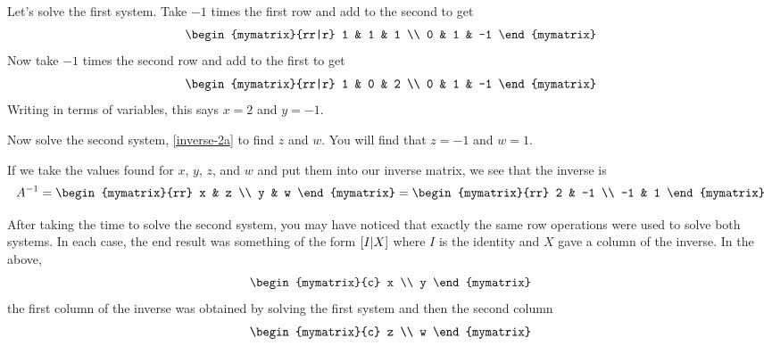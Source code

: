
Let's solve the first system. Take $-1$ times
the first row and add to the second to get
\begin{equation*}
  \begin{mymatrix}{rr|r}
    1 & 1 & 1 \\
    0 & 1 & -1
  \end{mymatrix}
\end{equation*}
Now take $-1$ times the second row and add to the first to
get
\begin{equation*}
  \begin{mymatrix}{rr|r}
    1 & 0 & 2 \\
    0 & 1 & -1
  \end{mymatrix} 
\end{equation*}
Writing in terms of variables, this says $x=2$ and $y=-1$.

Now solve the second system, \ref{inverse-2a} to find $z$ and $w$. You will find that 
$z = -1$ and $w = 1$.

If we take the values found for $x$, $y$, $z$, and $w$
and put them into our inverse matrix, we see that the inverse
is
\begin{equation*}
  A^{-1} = 
  \begin{mymatrix}{rr}
    x & z \\
    y & w
  \end{mymatrix}
  =
  \begin{mymatrix}{rr}
    2 & -1 \\
    -1 & 1
  \end{mymatrix} 
\end{equation*}

After taking the time to solve the second system, you may have noticed that exactly the same row
operations were used to solve both systems. In each case, the end result was
something of the form $\left[I|X\right] $ where $I$ is the
identity and $X$ gave a column of the inverse. In the above, 
\begin{equation*}
  \begin{mymatrix}{c}
    x \\
    y
  \end{mymatrix}
\end{equation*}
the first column of the inverse was obtained by solving the first system and then the
second column 
\begin{equation*}
  \begin{mymatrix}{c}
    z \\
    w
  \end{mymatrix} 
\end{equation*}

